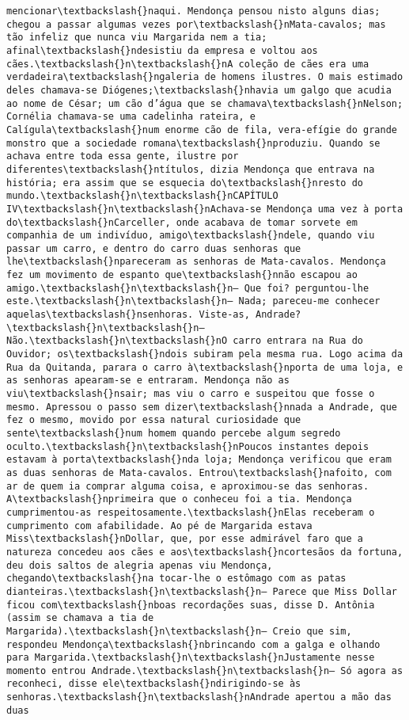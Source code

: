 \documentclass[11pt]{article}
\begin{document}
\begin{Verbatim}[commandchars=\\\{\}]
mencionar\textbackslash{}naqui. Mendonça pensou nisto alguns dias; chegou a passar algumas vezes por\textbackslash{}nMata-cavalos; mas tão infeliz que nunca viu Margarida nem a tia; afinal\textbackslash{}ndesistiu da empresa e voltou aos cães.\textbackslash{}n\textbackslash{}nA coleção de cães era uma verdadeira\textbackslash{}ngaleria de homens ilustres. O mais estimado deles chamava-se Diógenes;\textbackslash{}nhavia um galgo que acudia ao nome de César; um cão d’água que se chamava\textbackslash{}nNelson; Cornélia chamava-se uma cadelinha rateira, e Calígula\textbackslash{}num enorme cão de fila, vera-efígie do grande monstro que a sociedade romana\textbackslash{}nproduziu. Quando se achava entre toda essa gente, ilustre por diferentes\textbackslash{}ntítulos, dizia Mendonça que entrava na história; era assim que se esquecia do\textbackslash{}nresto do mundo.\textbackslash{}n\textbackslash{}nCAPÍTULO IV\textbackslash{}n\textbackslash{}nAchava-se Mendonça uma vez à porta do\textbackslash{}nCarceller, onde acabava de tomar sorvete em companhia de um indivíduo, amigo\textbackslash{}ndele, quando viu passar um carro, e dentro do carro duas senhoras que lhe\textbackslash{}npareceram as senhoras de Mata-cavalos. Mendonça fez um movimento de espanto que\textbackslash{}nnão escapou ao amigo.\textbackslash{}n\textbackslash{}n— Que foi? perguntou-lhe este.\textbackslash{}n\textbackslash{}n— Nada; pareceu-me conhecer aquelas\textbackslash{}nsenhoras. Viste-as, Andrade?\textbackslash{}n\textbackslash{}n— Não.\textbackslash{}n\textbackslash{}nO carro entrara na Rua do Ouvidor; os\textbackslash{}ndois subiram pela mesma rua. Logo acima da Rua da Quitanda, parara o carro à\textbackslash{}nporta de uma loja, e as senhoras apearam-se e entraram. Mendonça não as viu\textbackslash{}nsair; mas viu o carro e suspeitou que fosse o mesmo. Apressou o passo sem dizer\textbackslash{}nnada a Andrade, que fez o mesmo, movido por essa natural curiosidade que sente\textbackslash{}num homem quando percebe algum segredo oculto.\textbackslash{}n\textbackslash{}nPoucos instantes depois estavam à porta\textbackslash{}nda loja; Mendonça verificou que eram as duas senhoras de Mata-cavalos. Entrou\textbackslash{}nafoito, com ar de quem ia comprar alguma coisa, e aproximou-se das senhoras. A\textbackslash{}nprimeira que o conheceu foi a tia. Mendonça cumprimentou-as respeitosamente.\textbackslash{}nElas receberam o cumprimento com afabilidade. Ao pé de Margarida estava Miss\textbackslash{}nDollar, que, por esse admirável faro que a natureza concedeu aos cães e aos\textbackslash{}ncortesãos da fortuna, deu dois saltos de alegria apenas viu Mendonça, chegando\textbackslash{}na tocar-lhe o estômago com as patas dianteiras.\textbackslash{}n\textbackslash{}n— Parece que Miss Dollar ficou com\textbackslash{}nboas recordações suas, disse D. Antônia (assim se chamava a tia de Margarida).\textbackslash{}n\textbackslash{}n— Creio que sim, respondeu Mendonça\textbackslash{}nbrincando com a galga e olhando para Margarida.\textbackslash{}n\textbackslash{}nJustamente nesse momento entrou Andrade.\textbackslash{}n\textbackslash{}n— Só agora as reconheci, disse ele\textbackslash{}ndirigindo-se às senhoras.\textbackslash{}n\textbackslash{}nAndrade apertou a mão das duas 
\end{Verbatim}
\end{document}
